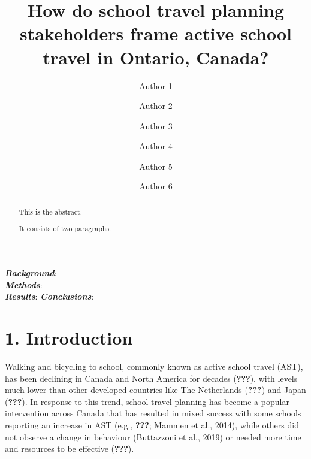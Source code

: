 \documentclass[]{elsarticle} %
\begin{document}
\begin{frontmatter}

  \title{How do school travel planning stakeholders frame active school travel in
Ontario, Canada?}
    \author[Some Department]{Author 1}
    \author[Some Department]{Author 2}
    \author[Another University]{Author 3}
    \author[Some Institute]{Author 4}
    \author[Some University]{Author 5}
    \author[Some Department]{Author 6}
      \address[Some Department]{Department, Street, City, Province, Postal Code}
    \address[Another University]{Department, Street, City, Province, Postal Code}
    \address[Some Institute]{Street, City, Province, Postal Code}
    \address[Some University]{Department, Street, City, Province, Postal Code}
  
  \begin{abstract}
  This is the abstract.
  
  It consists of two paragraphs.
  \end{abstract}
  
 \end{frontmatter}

\textbf{\emph{Background}}:\\
\textbf{\emph{Methods}}:\\
\textbf{\emph{Results}}: \textbf{\emph{Conclusions}}:

\newpage

\hypertarget{introduction}{%
\section{1. Introduction}\label{introduction}}

Walking and bicycling to school, commonly known as active school travel
(AST), has been declining in Canada and North America for decades
({\textbf{???}}), with levels much lower than other developed countries
like The Netherlands ({\textbf{???}}) and Japan ({\textbf{???}}). In
response to this trend, school travel planning has become a popular
intervention across Canada that has resulted in mixed success with some
schools reporting an increase in AST (e.g., {\textbf{???}}; Mammen et
al., 2014), while others did not observe a change in behaviour
(Buttazzoni et al., 2019) or needed more time and resources to be
effective ({\textbf{???}}).
\end{document}
